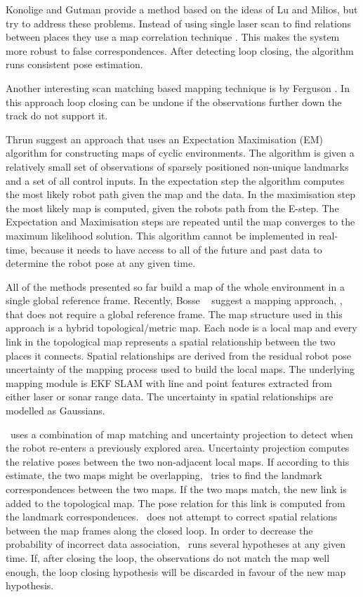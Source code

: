 Konolige and Gutman
\cite{konolige99:_increm_mappin_large_cyclic_envir} provide a method
based on the ideas of Lu and Milios, but try to address these
problems. Instead of using single laser scan to find relations between
places they use a map correlation technique \cite{konolige99}. This
makes the system more robust to false correspondences. After detecting
loop closing, the algorithm runs consistent pose estimation. 

Another interesting scan matching based mapping technique is
\cite{fergusson2003} by Ferguson \etal. In this approach loop closing
can be undone if the observations further down the track do not
support it.

Thrun \etal \cite{slam_thrun98b,Thrun98a,thrun98:_probab} suggest an
approach that uses an Expectation Maximisation (EM) algorithm for
constructing maps of cyclic environments. The algorithm is given a
relatively small set of observations of sparsely positioned non-unique
landmarks and a set of all control inputs. In the expectation step the
algorithm computes the most likely robot path given the map and the
data. In the maximisation step the most likely map is computed, given
the robots path from the E-step. The Expectation and Maximisation
steps are repeated until the map converges to the maximum likelihood
solution. This algorithm cannot be implemented in real-time, because
it needs to have access to all of the future and past data to
determine the robot pose at any given time.

All of the methods presented so far build a map of the whole
environment in a single global reference frame. Recently, Bosse \etal\
\cite{bosse02atlas} suggest a mapping approach, \Atlas, that does not
require a global reference frame. The map structure used in this
approach is a hybrid topological/metric map.  Each node is a local map
and every link in the topological map represents a spatial
relationship between the two places it connects.  Spatial
relationships are derived from the residual robot pose uncertainty of
the mapping process used to build the local maps. The underlying
mapping module is EKF SLAM with line and point features extracted from
either laser or sonar range data. The uncertainty in spatial
relationships are modelled as Gaussians.

\Atlas\ uses a combination of map matching and uncertainty projection
to detect when the robot re-enters a previously explored
area. Uncertainty projection computes the relative poses between the
two non-adjacent local maps. If according to this estimate, the two
maps might be overlapping, \Atlas\ tries to find the landmark
correspondences between the two maps. If the two maps match, the new
link is added to the topological map. The pose relation for this link
is computed from the landmark correspondences. \Atlas\ does not
attempt to correct spatial relations between the map frames along the
closed loop. In order to decrease the probability of incorrect data
association, \Atlas\ runs several hypotheses at any given time. If,
after closing the loop, the observations do not match the map well
enough, the loop closing hypothesis will be discarded in favour of the
new map hypothesis.

